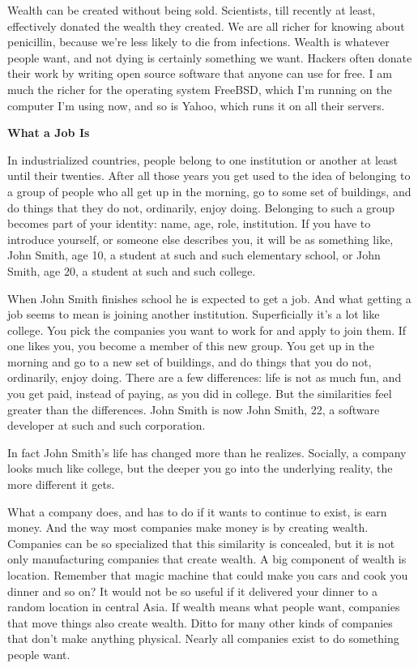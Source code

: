 \documentclass[12pt]{book}
\begin{document}
Wealth can be created without being sold. Scientists, till recently at
least, effectively donated the wealth they created. We are all richer
for knowing about penicillin, because we're less likely to die from
infections. Wealth is whatever people want, and not dying is certainly
something we want. Hackers often donate their work by writing open
source software that anyone can use for free. I am much the richer for
the operating system FreeBSD, which I'm running on the computer I'm
using now, and so is Yahoo, which runs it on all their servers.

\textbf{What a Job Is}

In industrialized countries, people belong to one institution or another
at least until their twenties. After all those years you get used to the
idea of belonging to a group of people who all get up in the morning, go
to some set of buildings, and do things that they do not, ordinarily,
enjoy doing. Belonging to such a group becomes part of your identity:
name, age, role, institution. If you have to introduce yourself, or
someone else describes you, it will be as something like, John Smith,
age 10, a student at such and such elementary school, or John Smith, age
20, a student at such and such college.

When John Smith finishes school he is expected to get a job. And what
getting a job seems to mean is joining another institution.
Superficially it's a lot like college. You pick the companies you want
to work for and apply to join them. If one likes you, you become a
member of this new group. You get up in the morning and go to a new set
of buildings, and do things that you do not, ordinarily, enjoy doing.
There are a few differences: life is not as much fun, and you get paid,
instead of paying, as you did in college. But the similarities feel
greater than the differences. John Smith is now John Smith, 22, a
software developer at such and such corporation.

In fact John Smith's life has changed more than he realizes. Socially, a
company looks much like college, but the deeper you go into the
underlying reality, the more different it gets.

What a company does, and has to do if it wants to continue to exist, is
earn money. And the way most companies make money is by creating wealth.
Companies can be so specialized that this similarity is concealed, but
it is not only manufacturing companies that create wealth. A big
component of wealth is location. Remember that magic machine that could
make you cars and cook you dinner and so on? It would not be so useful
if it delivered your dinner to a random location in central Asia. If
wealth means what people want, companies that move things also create
wealth. Ditto for many other kinds of companies that don't make anything
physical. Nearly all companies exist to do something people want.
\end{document}
